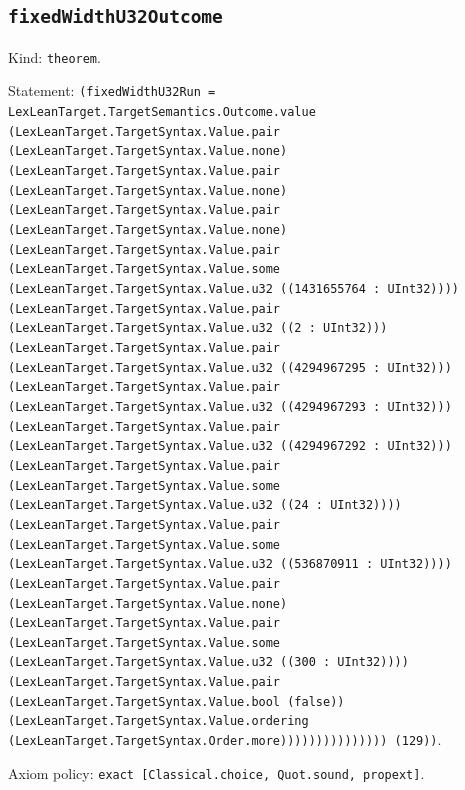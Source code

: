 \documentclass[11pt]{article}
\begin{document}
\subsection*{\texttt{fixedWidthU32Outcome}}
\noindent Kind: \texttt{theorem}.\par
\noindent Statement: \texttt{(fixedWidthU32Run = LexLeanTarget.TargetSemantics.Outcome.value (LexLeanTarget.TargetSyntax.Value.pair (LexLeanTarget.TargetSyntax.Value.none) (LexLeanTarget.TargetSyntax.Value.pair (LexLeanTarget.TargetSyntax.Value.none) (LexLeanTarget.TargetSyntax.Value.pair (LexLeanTarget.TargetSyntax.Value.none) (LexLeanTarget.TargetSyntax.Value.pair (LexLeanTarget.TargetSyntax.Value.some (LexLeanTarget.TargetSyntax.Value.u32 ((1431655764 : UInt32)))) (LexLeanTarget.TargetSyntax.Value.pair (LexLeanTarget.TargetSyntax.Value.u32 ((2 : UInt32))) (LexLeanTarget.TargetSyntax.Value.pair (LexLeanTarget.TargetSyntax.Value.u32 ((4294967295 : UInt32))) (LexLeanTarget.TargetSyntax.Value.pair (LexLeanTarget.TargetSyntax.Value.u32 ((4294967293 : UInt32))) (LexLeanTarget.TargetSyntax.Value.pair (LexLeanTarget.TargetSyntax.Value.u32 ((4294967292 : UInt32))) (LexLeanTarget.TargetSyntax.Value.pair (LexLeanTarget.TargetSyntax.Value.some (LexLeanTarget.TargetSyntax.Value.u32 ((24 : UInt32)))) (LexLeanTarget.TargetSyntax.Value.pair (LexLeanTarget.TargetSyntax.Value.some (LexLeanTarget.TargetSyntax.Value.u32 ((536870911 : UInt32)))) (LexLeanTarget.TargetSyntax.Value.pair (LexLeanTarget.TargetSyntax.Value.none) (LexLeanTarget.TargetSyntax.Value.pair (LexLeanTarget.TargetSyntax.Value.some (LexLeanTarget.TargetSyntax.Value.u32 ((300 : UInt32)))) (LexLeanTarget.TargetSyntax.Value.pair (LexLeanTarget.TargetSyntax.Value.bool (false)) (LexLeanTarget.TargetSyntax.Value.ordering (LexLeanTarget.TargetSyntax.Order.more))))))))))))))) (129))}.\par
\noindent Axiom policy: \texttt{exact [Classical.choice, Quot.sound, propext]}.\par
\end{document}
